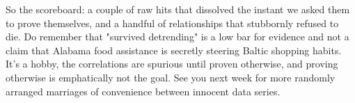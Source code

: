 So the scoreboard: a couple of raw hits that dissolved the instant we asked them to prove themselves, and a handful of relationships that stubbornly refused to die. Do remember that "survived detrending" is a low bar for evidence and not a claim that Alabama food assistance is secretly steering Baltic shopping habits. It's a hobby, the correlations are spurious until proven otherwise, and proving otherwise is emphatically not the goal. See you next week for more randomly arranged marriages of convenience between innocent data series.
